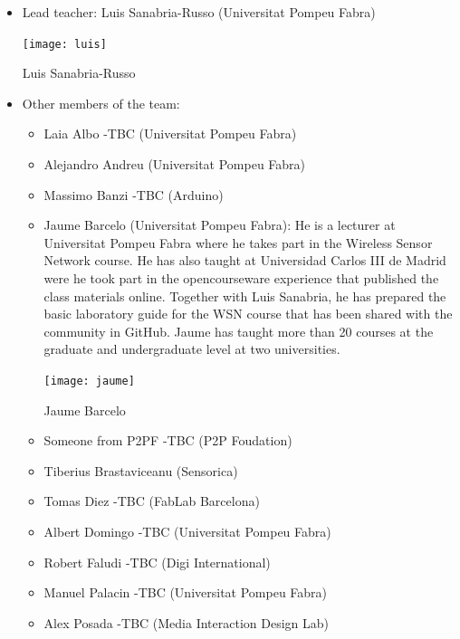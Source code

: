 \documentclass{tufte-book} %
\begin{document}
\begin{itemize}
\item Lead teacher: Luis Sanabria-Russo (Universitat Pompeu Fabra)
\begin{marginfigure}
\texttt{[image: luis]}
\caption{Luis Sanabria-Russo}
\label{fig:luis}
\end{marginfigure}
\item Other members of the team:
\begin{itemize}
\item Laia Albo -TBC (Universitat Pompeu Fabra)
\item Alejandro Andreu (Universitat Pompeu Fabra)
\item Massimo Banzi -TBC (Arduino)
\item Jaume Barcelo (Universitat Pompeu Fabra): He is a lecturer at Universitat Pompeu Fabra where he takes part in the Wireless Sensor Network course. He has also taught at Universidad Carlos III de Madrid were he took part in the opencourseware experience that published the class materials online. Together with Luis Sanabria, he has prepared the basic laboratory guide for the WSN course that has been shared with the community in GitHub. Jaume has taught more than 20 courses at the graduate and undergraduate level at two universities.
\begin{marginfigure}
\texttt{[image: jaume]}
\caption{Jaume Barcelo}
\label{fig:jaume}
\end{marginfigure}

\item Someone from P2PF -TBC (P2P Foudation)
\item Tiberius Brastaviceanu (Sensorica)
\item Tomas Diez -TBC (FabLab Barcelona)
\item Albert Domingo -TBC (Universitat Pompeu Fabra)
\item Robert Faludi -TBC (Digi International)
\item Manuel Palacin -TBC (Universitat Pompeu Fabra)
\item Alex Posada -TBC (Media Interaction Design Lab)
\end{itemize}
\end{itemize}



\backmatter




\printindex %
\end{document}
